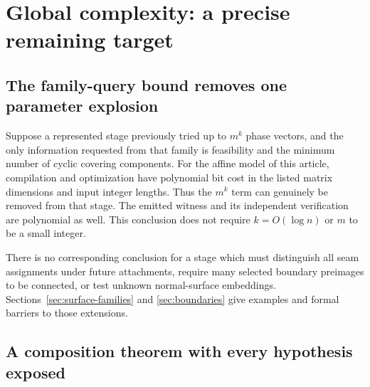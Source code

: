 \section{Global complexity: a precise remaining target}
\label{sec:global}

\subsection{The family-query bound removes one parameter explosion}

Suppose a represented stage previously tried up to $m^k$ phase vectors,
and the only information requested from that family is feasibility and
the minimum number of cyclic covering components. For the affine model
of this article, compilation and optimization have polynomial bit cost
in the listed matrix dimensions and input integer lengths. Thus the
$m^k$ term can genuinely be removed from that stage. The emitted witness
and its independent verification are polynomial as well. This conclusion
does not require $k=O(\log n)$ or $m$ to be a small integer.

There is no corresponding conclusion for a stage which must distinguish
all seam assignments under future attachments, require many selected
boundary preimages to be connected, or test unknown normal-surface
embeddings. Sections~\ref{sec:surface-families} and \ref{sec:boundaries}
give examples and formal barriers to those extensions.

\subsection{A composition theorem with every hypothesis exposed}


